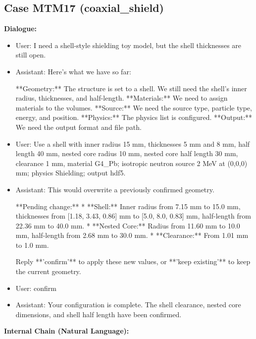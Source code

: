 \documentclass[11pt]{ctexart}
\begin{document}
\subsection{Case MTM17 (coaxial\_shield)}
\textbf{Dialogue:}
\begin{itemize}
\item User: I need a shell-style shielding toy model, but the shell thicknesses are still open.
\item Assistant: Here's what we have so far:

**Geometry:** The structure is set to a shell. We still need the shell's inner radius, thicknesses, and half-length.
**Materials:** We need to assign materials to the volumes.
**Source:** We need the source type, particle type, energy, and position.
**Physics:** The physics list is configured.
**Output:** We need the output format and file path.
\item User: Use a shell with inner radius 15 mm, thicknesses 5 mm and 8 mm, half length 40 mm, nested core radius 10 mm, nested core half length 30 mm, clearance 1 mm, material G4\_Pb; isotropic neutron source 2 MeV at (0,0,0) mm; physics Shielding; output hdf5.
\item Assistant: This would overwrite a previously confirmed geometry.

**Pending change:**
*   **Shell:** Inner radius from 7.15 mm to 15.0 mm, thicknesses from [1.18, 3.43, 0.86] mm to [5.0, 8.0, 0.83] mm, half-length from 22.36 mm to 40.0 mm.
*   **Nested Core:** Radius from 11.60 mm to 10.0 mm, half-length from 2.68 mm to 30.0 mm.
*   **Clearance:** From 1.01 mm to 1.0 mm.

Reply **'confirm'** to apply these new values, or **'keep existing'** to keep the current geometry.
\item User: confirm
\item Assistant: Your configuration is complete. The shell clearance, nested core dimensions, and shell half length have been confirmed.
\end{itemize}
\textbf{Internal Chain (Natural Language):}
\end{document}
